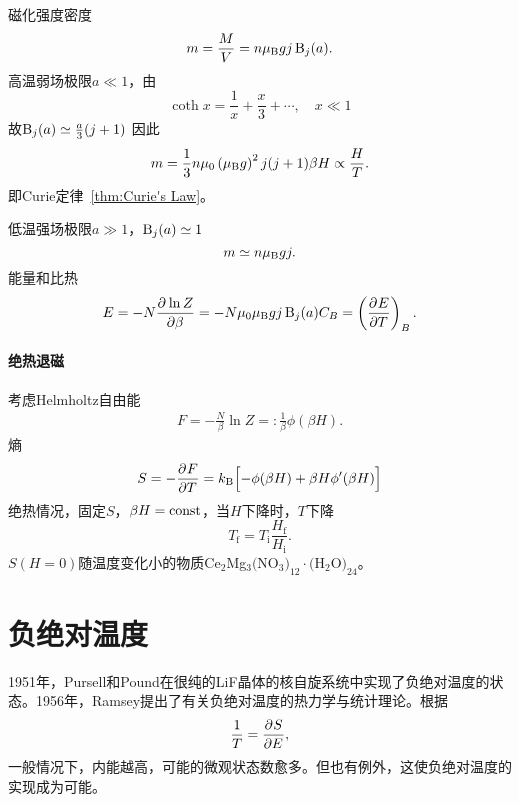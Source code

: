 磁化强度密度
\begin{align}
	m=\frac MV=n\muB gj\Brill_j(a). %
\end{align}
高温弱场极限$a\ll 1$，由
\[
	\coth x=\frac1x+\frac x3+\cdots,\quad x\ll 1
\]
故$\operatorname{B}_j(a)\simeq\frac a3(j+1)$
因此
\[
	m=\frac13n\mu_0\left(\mu_\mathrm B g\right)^2j(j+1)\beta H\propto\frac HT.
\]
即Curie定律~\ref{thm:Curie's Law}。

低温强场极限$a\gg 1$，$\operatorname{B}_j(a)\simeq 1$
\[
	m\simeq n\mu_\mathrm B gj.
\]
能量和比热
\begin{gather}
	E=-N\frac{\partial^{{}}\ln Z}{\partial{\beta}^{{}}}=-N\mu_0\mu_\mathrm B gj\operatorname{B}_j(a)
	C_B=\left(\frac{\partial^{{}}E}{\partial{T}^{{}}}\right)_B.
\end{gather}

\paragraph{绝热退磁}考虑Helmholtz自由能
\begin{align}
	F=-\frac N\beta\ln Z=:\frac1\beta\phi(\beta H).
\end{align}
熵
\begin{align}
	S=-\frac{\partial^{{}}F}{\partial{T}^{{}}}=k_{\mathrm B}\Bigl[-\phi(\beta H)+\beta H\phi'(\beta H)\Bigr]
\end{align}
绝热情况，固定$S$，$\beta H=\text{const}$，当$H$下降时，$T$下降
\[
	T_\mathrm f=T_\mathrm i\frac{H_\mathrm f}{H_\mathrm i}.
\]
$S(H=0)$随温度变化小的物质Ce$_2$Mg$_3($NO$_3)_{12}\cdot($H$_2$O$)_{24}$。
\section{负绝对温度}
1951年，Pursell和Pound在很纯的LiF晶体的核自旋系统中实现了负绝对温度的状态。1956年，Ramsey提出了有关负绝对温度的热力学与统计理论。根据
\[
	\frac1T=\frac{\partial^{{}}S}{\partial{E}^{{}}},
\]
一般情况下，内能越高，可能的微观状态数愈多。但也有例外，这使负绝对温度的实现成为可能。
